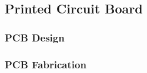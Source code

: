 \subsection{Printed Circuit Board}
\subsubsection{PCB Design}
        
\subsubsection{PCB Fabrication}